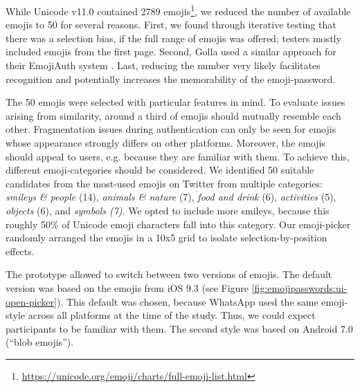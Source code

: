 While Unicode v11.0 contained 2789 emojis\footnote{\label{foot:full-list-of-emojis}\url{https://unicode.org/emoji/charts/full-emoji-list.html}}, we reduced the number of available emojis to 50 for several reasons. First, we found through iterative testing that there was a selection bias, if the full range of emojis was offered; testers mostly included emojis from the first page. %
Second, Golla \etal used a similar approach for their EmojiAuth system \cite{Golla2017EmojiAuth, Kraus2017Emoji}. Last, reducing the number very likely facilitates recognition and potentially increases the memorability of the emoji-password.

The 50 emojis were selected with particular features in mind. To evaluate issues arising from similarity, around a third of emojis should mutually resemble each other. Fragmentation issues during authentication can only be seen for emojis whose appearance strongly differs on other platforms. Moreover, the emojis should appeal to users, e.g. because they are familiar with them. To achieve this, different emoji-categories should be considered. We identified 50 suitable candidates from the most-used emojis on Twitter from multiple categories: \textit{smileys \& people} (14), \textit{animals \& nature} (7), \textit{food and drink} (6), \textit{activities} (5), \textit{objects} (6), and \textit{symbols (7)}. We opted to include more smileys, because this roughly 50\% of Unicode emoji characters fall into this category. Our emoji-picker randomly arranged the emojis in a 10x5 grid to isolate selection-by-position effects. 

The prototype allowed to switch between two versions of emojis. The default version was based on the emojis from iOS 9.3 (see Figure \ref{fig:emojipasswords:ui-open-picker}). This default was chosen, because WhatsApp used the same emoji-style across all platforms at the time of the study. Thus, we could expect participants to be familiar with them. The second style was based on Android 7.0 (``blob emojis''). 


